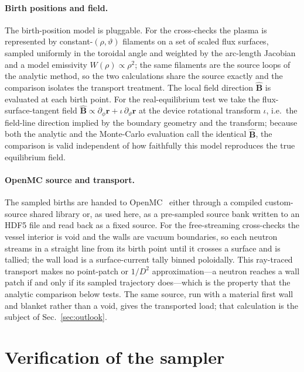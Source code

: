 \documentclass[11pt]{article}
\newcommand{\Bhat}{\hat{\bm{B}}}
\begin{document}
\paragraph{Birth positions and field.}
The birth-position model is pluggable. For the cross-checks the plasma is represented by
constant-$(\rho,\vartheta)$ filaments on a set of scaled flux surfaces, sampled uniformly
in the toroidal angle and weighted by the arc-length Jacobian and a model emissivity
$W(\rho)\propto\rho^2$; the same filaments are the source loops of the analytic method, so
the two calculations share the source exactly and the comparison isolates the transport
treatment. The local field direction $\Bhat$ is evaluated at each birth point. For the
real-equilibrium test we take the flux-surface-tangent field
$\Bhat\propto\partial_\phi\bm r+\iota\,\partial_\vartheta\bm r$ at the device rotational
transform $\iota$, i.e.\ the field-line direction implied by the boundary geometry and the
transform; because both the analytic and the Monte-Carlo evaluation call the identical
$\Bhat$, the comparison is valid independent of how faithfully this model reproduces the
true equilibrium field.

\paragraph{OpenMC source and transport.}
The sampled births are handed to OpenMC~\cite{romano2015} either through a compiled
custom-source shared library or, as used here, as a pre-sampled source bank written to an
HDF5 file and read back as a fixed source. For the free-streaming cross-checks the vessel
interior is void and the walls are vacuum boundaries, so each neutron streams in a
straight line from its birth point until it crosses a surface and is tallied; the wall
load is a surface-current tally binned poloidally. This ray-traced transport makes no
point-patch or $1/D^2$ approximation---a neutron reaches a wall patch if and only if its
sampled trajectory does---which is the property that the analytic comparison below tests.
The same source, run with a material first wall and blanket rather than a void, gives the
transported load; that calculation is the subject of Sec.~\ref{sec:outlook}.

\section{Verification of the sampler}
\label{sec:sampler}
\end{document}
